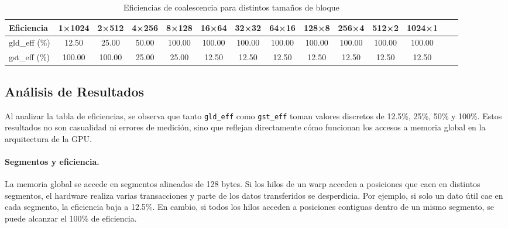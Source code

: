 \documentclass[a4paper,11pt]{article}
\begin{document}
\begin{table}[H]
  \centering
  \caption{Eficiencias de coalescencia para distintos tamaños de bloque}
  \small
  \setlength{\tabcolsep}{3pt}
  \begin{tabular}{l*{13}{S}}
    \toprule
    \textbf{Eficiencia} & \textbf{1×1024} & \textbf{2×512} & \textbf{4×256} & \textbf{8×128} & \textbf{16×64} & \textbf{32×32} & \textbf{64×16} & \textbf{128×8} & \textbf{256×4} & \textbf{512×2} & \textbf{1024×1} \\
    \midrule
    gld\_eff (\%) & 12.50 & 25.00 & 50.00 & 100.00 & 100.00 & 100.00 & 100.00 & 100.00 & 100.00 & 100.00 & 100.00 \\
    gst\_eff (\%) & 100.00 & 100.00 & 25.00 & 25.00 & 12.50 & 12.50 & 12.50 & 12.50 & 12.50 & 12.50 & 12.50 \\
    \bottomrule
  \end{tabular}
\end{table}





\subsection{Análisis de Resultados}

Al analizar la tabla de eficiencias, se observa que tanto \texttt{gld\_eff} como \texttt{gst\_eff} toman valores discretos de 12.5\%, 25\%, 50\% y 100\%. Estos resultados no son casualidad ni errores de medición, sino que reflejan directamente cómo funcionan los accesos a memoria global en la arquitectura de la GPU.

\paragraph{Segmentos y eficiencia.}
La memoria global se accede en segmentos alineados de 128 bytes. Si los hilos de un warp acceden a posiciones que caen en distintos segmentos, el hardware realiza varias transacciones y parte de los datos transferidos se desperdicia. Por ejemplo, si solo un dato útil cae en cada segmento, la eficiencia baja a 12.5\%. En cambio, si todos los hilos acceden a posiciones contiguas dentro de un mismo segmento, se puede alcanzar el 100\% de eficiencia.
\end{document}
